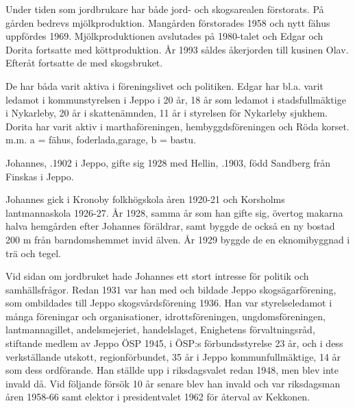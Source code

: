 Under tiden som jordbrukare har både jord- och skogsarealen förstorats. På gården bedrevs mjölkproduktion. Mangården förstorades 1958 och nytt fähus uppfördes 1969. Mjölkproduktionen avslutades på 1980-talet och Edgar och Dorita fortsatte med köttproduktion. År 1993 såldes åkerjorden till kusinen Olav. Efteråt fortsatte de med skogsbruket.


De har båda varit aktiva i föreningslivet och politiken. Edgar har bl.a. varit ledamot i kommunstyrelsen i Jeppo i 20 år, 18 år som ledamot i stadsfullmäktige i Nykarleby, 20 år i skattenämnden, 11 år i styrelsen för Nykarleby sjukhem. Dorita har varit aktiv i marthaföreningen, hembyggdsföreningen och Röda korset. m.m. a = fähus, foderlada,garage, b = bastu.


Johannes, .1902 i Jeppo, gifte sig 1928 med Hellin, .1903, född Sandberg från Finskas i Jeppo.
\begin{jhchildren}
  \item {}
  \item {}
  \item {}
\end{jhchildren}
Johannes gick i Kronoby folkhögskola åren 1920-21 och Korsholms lantmannaskola 1926-27. År 1928, samma år som han gifte sig, övertog makarna halva hemgården efter Johannes föräldrar, samt byggde de också en ny bostad 200 m från barndomshemmet invid älven. År 1929 byggde de en eknomibyggnad i trä och tegel.

Vid sidan om jordbruket hade Johannes ett stort intresse för politik och samhällsfrågor. Redan 1931 var han med och bildade Jeppo skogsägarförening, som ombildades till Jeppo skogsvårdsförening 1936. Han var styrelseledamot i många föreningar och organisationer, idrottsföreningen, ungdomsföreningen, lantmannagillet, andelsmejeriet, handelslaget, Enighetens förvaltningsråd, stiftande medlem av Jeppo ÖSP 1945, i ÖSP:s förbundsstyrelse 23 år, och i dess verkställande utskott, regionförbundet, 35 år i Jeppo kommunfullmäktige, 14 år som dess ordförande. Han ställde upp i riksdagsvalet redan 1948, men blev inte invald då. Vid följande försök 10 år senare blev han invald och var riksdagsman åren 1958-66 samt elektor i presidentvalet 1962 för återval av Kekkonen.

